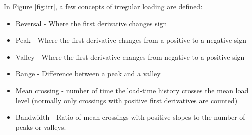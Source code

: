 In Figure \ref{fig:irr}, a few concepts of irregular loading are defined:
\begin{itemize}
\item Reversal - Where the first derivative changes sign
    \item Peak - Where the first derivative changes from a positive to a negative sign
    \item Valley - Where the first derivative changes from negative to a positive sign
    \item Range - Difference between a peak and a valley
    \item Mean crossing - number of time the load-time history crosses the mean load level (normally only crossings with positive first derivatives are counted)
    \item Bandwidth - Ratio of mean crossings with positive slopes to the number of peaks or valleys. 
\end{itemize}
 
